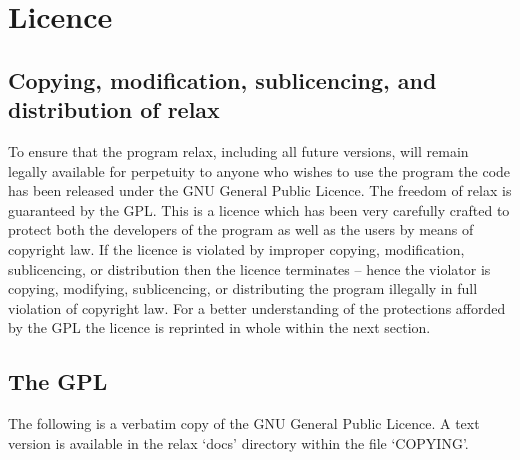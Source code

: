 
\chapter{Licence}



\section{Copying, modification, sublicencing, and distribution of relax}

To ensure that the program relax, including all future versions, will remain legally available for perpetuity to anyone who wishes to use the program the code has been released under the GNU General Public Licence.
The freedom of relax is guaranteed by the GPL.
This is a licence which has been very carefully crafted to protect both the developers of the program as well as the users by means of copyright law.
If the licence is violated by improper copying, modification, sublicencing, or distribution then the licence terminates -- hence the violator is copying, modifying, sublicencing, or distributing the program illegally in full violation of copyright law.
For a better understanding of the protections afforded by the GPL the licence is reprinted in whole within the next section.




\section{The GPL}

The following is a verbatim copy of the GNU General Public Licence.
A text version is available in the relax `docs' directory within the file `COPYING'.


\newpage


